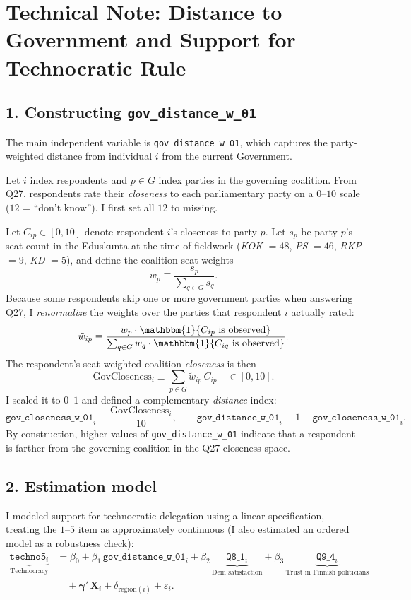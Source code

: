 \documentclass[11pt]{article}
\begin{document}
\section*{Technical Note: Distance to Government and Support for Technocratic Rule}

\subsection*{1. Constructing \texttt{gov\_distance\_w\_01}}

The main independent variable is \texttt{gov\_distance\_w\_01}, which captures the party-weighted distance from individual $i$ from the current Government.

Let $i$ index respondents and $p \in G$ index parties in the governing coalition.
From Q27, respondents rate their \emph{closeness} to each parliamentary party on a $0$--$10$ scale
($12$ = ``don't know''). I first set all $12$ to missing. 

Let $C_{ip} \in [0,10]$ denote respondent $i$'s closeness to party $p$.
Let $s_p$ be party $p$'s seat count in the Eduskunta at the time of fieldwork
(\emph{KOK} $=48$, \emph{PS} $=46$, \emph{RKP} $=9$, \emph{KD} $=5$),
and define the coalition seat weights
\[
w_p \equiv \frac{s_p}{\sum_{q \in G} s_q}.
\]
Because some respondents skip one or more government parties when answering Q27, I \emph{renormalize} the weights over the parties that respondent $i$ actually rated:
\[
\tilde w_{ip} \equiv 
\frac{w_p \cdot \mathbbm{1}\{C_{ip}\text{ is observed}\}}
{\sum_{q \in G} w_q \cdot \mathbbm{1}\{C_{iq}\ \text{is observed}\}}.
\]
The respondent's seat-weighted coalition \emph{closeness} is then
\[
\text{GovCloseness}_i \equiv \sum_{p \in G} \tilde w_{ip}\, C_{ip}
\quad \in [0,10].
\]
I scaled it to $0$--$1$ and defined a complementary \emph{distance} index:
\[
\texttt{gov\_closeness\_w\_01}_i \equiv \frac{\text{GovCloseness}_i}{10},
\qquad
\texttt{gov\_distance\_w\_01}_i \equiv 1 - \texttt{gov\_closeness\_w\_01}_i.
\]
By construction, higher values of \texttt{gov\_distance\_w\_01} indicate that a respondent is
farther from the governing coalition in the Q27 closeness space.

\subsection*{2. Estimation model}

I modeled support for technocratic delegation using a linear specification,
treating the $1$--$5$ item as approximately continuous (I also estimated an ordered model as a robustness check):
\[
\begin{aligned}
\underbrace{\texttt{techno5}_i}_{\text{Technocracy}}
&= \beta_0 + \beta_1\,\texttt{gov\_distance\_w\_01}_i
  + \beta_2\,\underbrace{\texttt{Q8\_1}_i}_{\text{Dem satisfaction}}
  + \beta_3\,\underbrace{\texttt{Q9\_4}_i}_{\text{Trust in Finnish politicians}} \\
&\quad + \boldsymbol{\gamma}'\,\mathbf{X}_i
  + \delta_{\text{region}(i)} + \varepsilon_i .
\end{aligned}
\]
\end{document}
